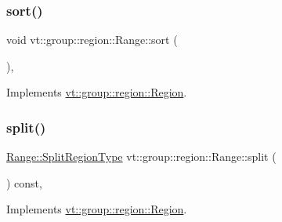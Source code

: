 \mbox{\label{structvt_1_1group_1_1region_1_1_range_aa24e09be54662ffd11413803689ed7f8}} 
\subsubsection{\texorpdfstring{sort()}{sort()}}
{\footnotesize\ttfamily void vt\+::group\+::region\+::\+Range\+::sort (\begin{DoxyParamCaption}{ }\end{DoxyParamCaption})\hspace{0.3cm}{\ttfamily [override]}, {\ttfamily [virtual]}}



Implements \hyperlink{structvt_1_1group_1_1region_1_1_region_a169304bf82a87ff958333595bed2603d}{vt\+::group\+::region\+::\+Region}.

\mbox{\label{structvt_1_1group_1_1region_1_1_range_a0d2542edc1fccecc5ba898484f0ccd3f}} 
\subsubsection{\texorpdfstring{split()}{split()}}
{\footnotesize\ttfamily \hyperlink{structvt_1_1group_1_1region_1_1_region_ab8d05c0978c7f38292a9ed5a15498a4b}{Range\+::\+Split\+Region\+Type} vt\+::group\+::region\+::\+Range\+::split (\begin{DoxyParamCaption}{ }\end{DoxyParamCaption}) const\hspace{0.3cm}{\ttfamily [override]}, {\ttfamily [virtual]}}



Implements \hyperlink{structvt_1_1group_1_1region_1_1_region_a2cbbbff6358f0f63235d95501858f512}{vt\+::group\+::region\+::\+Region}.

\mbox{\label{structvt_1_1group_1_1region_1_1_range_a6fcfec2c3fabe024559c2f278a8d12e5}} 
